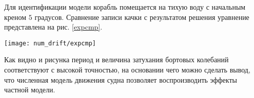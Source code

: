 Для идентификации модели корабль помещается на тихую воду с начальным креном $5$ градусов. Сравнение записи качки с результатом решения уравнение представлена на рис. \ref{expcmp}.

\begin{sidewaysfigure}
	\texttt{[image: num\_drift/expcmp]}
	\caption{Сравнение результатов численного эксперимента и решения уравнение бортовой качки}
	\label{expcmp}
\end{sidewaysfigure}

Как видно и рисунка период и величина затухания бортовых колебаний соответствуют с высокой точностью, на основании чего можно сделать вывод, что численная модель движения судна позволяет воспроизводить эффекты частной модели.

